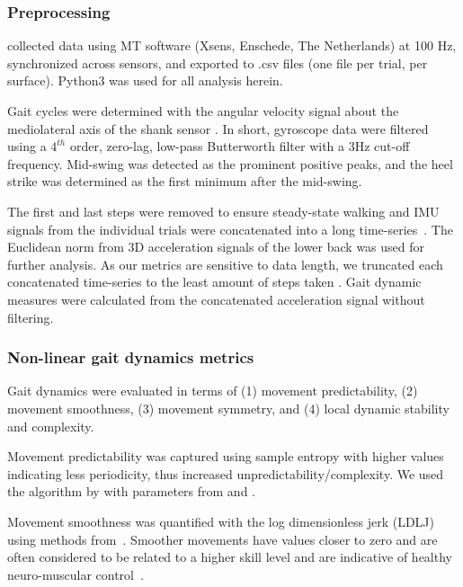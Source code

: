 \documentclass[authoryear,preprint,review,12pt]{elsarticle}
\begin{document}
\subsubsection{Preprocessing}
\citet{luo_database_2020} collected data using MT software (Xsens, Enschede, The Netherlands) at 100 Hz, synchronized across sensors, and exported to .csv files (one file per trial, per surface). Python3 was used for all analysis herein.

Gait cycles were determined with the angular velocity signal about the mediolateral axis of the shank sensor \citep{mcgrath2012gyroscope}. In short, gyroscope data were filtered using a $4^{th}$ order, zero-lag, low-pass Butterworth filter with a 3Hz cut-off frequency. Mid-swing was detected as the prominent positive peaks, and the heel strike was determined as the first minimum after the mid-swing. 

The first and last steps were removed to ensure steady-state walking \citep{breniere_when_1986} and IMU signals from the individual trials were concatenated into a long time-series~\citep{preatoni_motor_2010, emmerzaal_movement_2022}. The Euclidean norm from 3D acceleration signals of the lower back was used for further analysis. As our metrics are sensitive to data length, we truncated each concatenated time-series to the least amount of steps taken \citep{yentes2013appropriate}. Gait dynamic measures were calculated from the concatenated acceleration signal without filtering.

\subsubsection{Non-linear gait dynamics metrics}
Gait dynamics were evaluated in terms of (1) movement predictability, (2) movement smoothness, (3) movement symmetry, and (4) local dynamic stability and complexity.

Movement predictability was captured using sample entropy with higher values indicating less periodicity, thus increased unpredictability/complexity. We used the algorithm by \citet{richman_physiological_2000} with parameters from \citet{yentes2013appropriate} and \citet{govindan2007revisiting}.

Movement smoothness was quantified with the log dimensionless jerk (LDLJ) using methods from~\citet{melendez-calderon_estimating_2021}. Smoother movements have values closer to zero and are often considered to be related to a higher skill level and are indicative of healthy neuro-muscular control~\citep{balasubramanian_analysis_2015}. 
\end{document}
